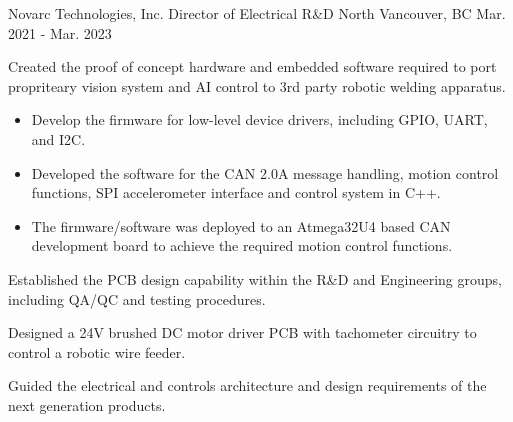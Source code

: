 \begin{cventries}
    \cventry
    {Novarc Technologies, Inc.} %
    {Director of Electrical R\&D} %
    {North Vancouver, BC} %
    {Mar. 2021 - Mar. 2023} %
    { %
        \begin{cvitems}
            \item {Created the proof of concept hardware and embedded software required to port propriteary vision system and AI control to 3rd party robotic welding apparatus.}
            \begin{itemize}
                \item {Develop the firmware for low-level device drivers, including GPIO, UART, and I2C.}
                \item {Developed the software for the CAN 2.0A message handling, motion control functions, SPI accelerometer interface and control system in C++.}
                \item {The firmware/software was deployed to an Atmega32U4 based CAN development board to achieve the required motion control functions.}
            \end{itemize}
            \item {Established the PCB design capability within the R\&D and Engineering groups, including QA/QC and testing procedures.}
            \item {Designed a 24V brushed DC motor driver PCB with tachometer circuitry to control a robotic wire feeder.}
            \item {Guided the electrical and controls architecture and design requirements of the next generation products.}
        \end{cvitems}
        \vspace{3mm}
        \vspace{1mm}
    }




\end{cventries}
